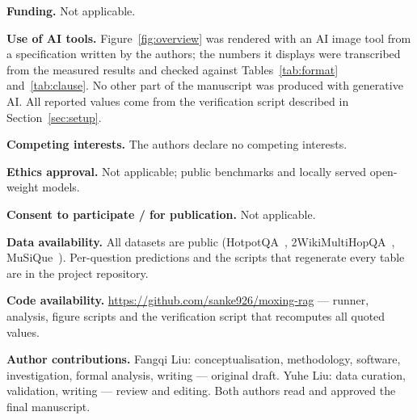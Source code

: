 ﻿\documentclass[11pt]{article}
\begin{document}
\noindent\textbf{Funding.} Not applicable.

\noindent\textbf{Use of AI tools.} Figure~\ref{fig:overview} was rendered with an AI image tool
from a specification written by the authors; the numbers it displays were transcribed from the
measured results and checked against Tables~\ref{tab:format} and~\ref{tab:clause}. No other part
of the manuscript was produced with generative AI. All reported values come from the
verification script described in Section~\ref{sec:setup}.

\noindent\textbf{Competing interests.} The authors declare no competing interests.

\noindent\textbf{Ethics approval.} Not applicable; public benchmarks and locally served
open-weight models.

\noindent\textbf{Consent to participate / for publication.} Not applicable.

\noindent\textbf{Data availability.} All datasets are public
(HotpotQA~\cite{yang2018hotpotqa}, 2WikiMultiHopQA~\cite{ho2020},
MuSiQue~\cite{trivedi2022musique}). Per-question predictions and the scripts that regenerate
every table are in the project repository.

\noindent\textbf{Code availability.}
\url{https://github.com/sanke926/moxing-rag} --- runner, analysis, figure scripts and the
verification script that recomputes all quoted values.

\noindent\textbf{Author contributions.} Fangqi Liu: conceptualisation, methodology, software,
investigation, formal analysis, writing --- original draft. Yuhe Liu: data curation,
validation, writing --- review and editing. Both authors read and approved the final
manuscript.
\end{document}
